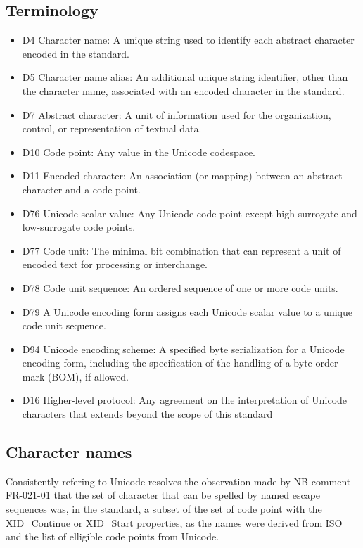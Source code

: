 \documentclass{wg21}
\begin{document}
\subsection{Terminology}
\begin{itemize}
\item D4 Character name: A unique string used to identify each abstract character encoded in
the standard.
\item D5 Character name alias: An additional unique string identifier, other than the character name, associated with an encoded character in the standard.
\item D7 Abstract character: A unit of information used for the organization, control, or representation of textual data.
\item D10 Code point: Any value in the Unicode codespace.
\item D11 Encoded character: An association (or mapping) between an abstract character and
a code point.
\item D76 Unicode scalar value: Any Unicode code point except high-surrogate and low-surrogate code points.
\item D77 Code unit: The minimal bit combination that can represent a unit of encoded text for processing or interchange.
\item D78 Code unit sequence: An ordered sequence of one or more code units.
\item D79 A Unicode encoding form assigns each Unicode scalar value to a unique code unit sequence.
\item D94 Unicode encoding scheme: A specified byte serialization for a Unicode encoding
form, including the specification of the handling of a byte order mark (BOM), if
allowed.
\item D16 Higher-level protocol: Any agreement on the interpretation of Unicode characters
that extends beyond the scope of this standard
\end{itemize}

\subsection{Character names}

Consistently refering to Unicode resolves the observation made by NB comment FR-021-01
that the set of character that can be spelled by named escape sequences  was, in the standard,
a subset of the set of code point with the XID_Continue or XID_Start properties, as the names were derived from ISO
and the list of elligible code points from Unicode.
\end{document}
